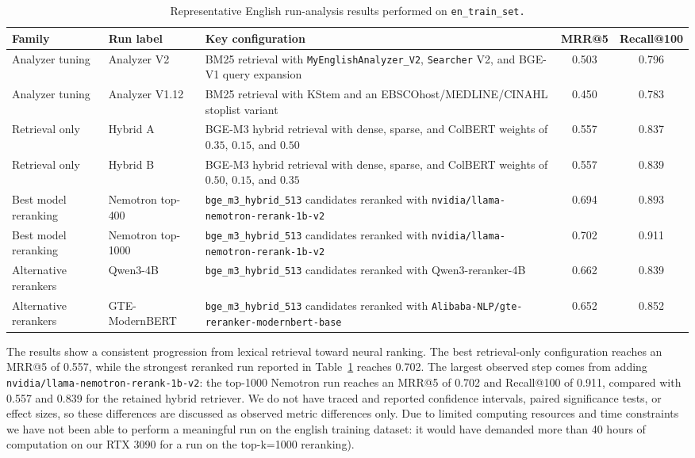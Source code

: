 \begin{table}[htbp]
    \centering
    \footnotesize
    \caption{Representative English run-analysis results performed on \texttt{en\_train\_set.}}
    \label{tab:main-results}
    \begin{tabular}{p{2.4cm} p{3.0cm} p{6.2cm} c c}
        \toprule
        Family & Run label & Key configuration & MRR@5 & Recall@100 \\
        \midrule
        Analyzer tuning & Analyzer V2 & BM25 retrieval with \texttt{MyEnglishAnalyzer\_V2}, \texttt{Searcher} V2, and BGE-V1 query expansion & 0.503 & 0.796 \\
        Analyzer tuning & Analyzer V1.12 & BM25 retrieval with KStem and an EBSCOhost/MEDLINE/CINAHL stoplist variant & 0.450 & 0.783 \\
        Retrieval only & Hybrid A & BGE-M3 hybrid retrieval with dense, sparse, and ColBERT weights of $0.35$, $0.15$, and $0.50$ & 0.557 & 0.837 \\
        Retrieval only & Hybrid B & BGE-M3 hybrid retrieval with dense, sparse, and ColBERT weights of $0.50$, $0.15$, and $0.35$ & 0.557 & 0.839 \\
        Best model reranking & Nemotron top-400 & \texttt{bge\_m3\_hybrid\_513} candidates reranked with \nolinkurl{nvidia/llama-nemotron-rerank-1b-v2} & 0.694 & 0.893 \\
        Best model reranking & Nemotron top-1000 & \texttt{bge\_m3\_hybrid\_513} candidates reranked with \nolinkurl{nvidia/llama-nemotron-rerank-1b-v2} & 0.702 & 0.911 \\
        Alternative rerankers & Qwen3-4B & \texttt{bge\_m3\_hybrid\_513} candidates reranked with Qwen3-reranker-4B & 0.662 & 0.839 \\
        Alternative rerankers & GTE-ModernBERT & \texttt{bge\_m3\_hybrid\_513} candidates reranked with \nolinkurl{Alibaba-NLP/gte-reranker-modernbert-base} & 0.652 & 0.852 \\
        \bottomrule
    \end{tabular}
\end{table}

The results show a consistent progression from lexical retrieval toward neural ranking. The best retrieval-only configuration reaches an MRR@5 of 0.557, while the strongest reranked run reported in Table~\ref{tab:main-results} reaches 0.702. The largest observed step comes from adding \texttt{nvidia/llama-nemotron-rerank-1b-v2}: the top-1000 Nemotron run reaches an MRR@5 of 0.702 and Recall@100 of 0.911, compared with 0.557 and 0.839 for the retained hybrid retriever. We do not have traced and reported confidence intervals, paired significance tests, or effect sizes, so these differences are discussed as observed metric differences only. Due to limited computing resources and time constraints we have not been able to perform a meaningful run on the english training dataset: it would have demanded more than 40 hours of computation on our RTX 3090 for a run on the top-k=1000 reranking).

